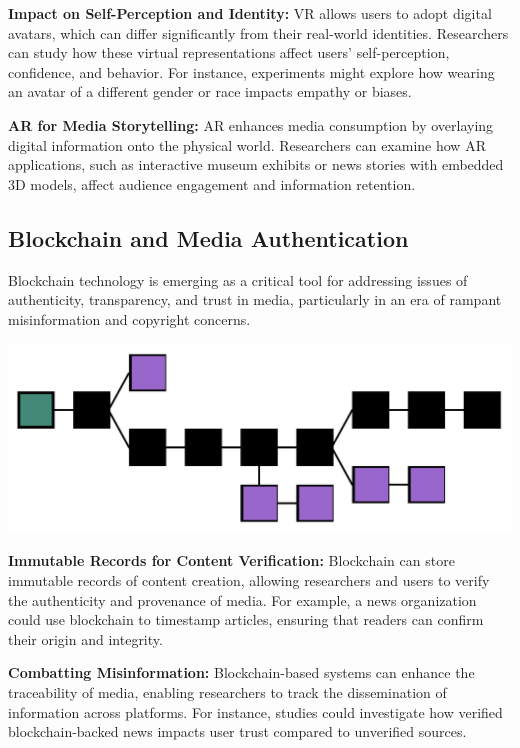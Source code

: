 \documentclass[
]{book}
\begin{document}
\textbf{Impact on Self-Perception and Identity:} VR allows users to adopt digital avatars, which can differ significantly from their real-world identities. Researchers can study how these virtual representations affect users' self-perception, confidence, and behavior. For instance, experiments might explore how wearing an avatar of a different gender or race impacts empathy or biases.

\textbf{AR for Media Storytelling:} AR enhances media consumption by overlaying digital information onto the physical world. Researchers can examine how AR applications, such as interactive museum exhibits or news stories with embedded 3D models, affect audience engagement and information retention.

\subsection{Blockchain and Media Authentication}\label{blockchain-and-media-authentication}

Blockchain technology is emerging as a critical tool for addressing issues of authenticity, transparency, and trust in media, particularly in an era of rampant misinformation and copyright concerns.

\href{https://en.wikipedia.org/wiki/Blockchain}{\includegraphics[width=1\textwidth,height=\textheight]{images/blockchain.png}}

\textbf{Immutable Records for Content Verification:} Blockchain can store immutable records of content creation, allowing researchers and users to verify the authenticity and provenance of media. For example, a news organization could use blockchain to timestamp articles, ensuring that readers can confirm their origin and integrity.

\textbf{Combatting Misinformation:} Blockchain-based systems can enhance the traceability of media, enabling researchers to track the dissemination of information across platforms. For instance, studies could investigate how verified blockchain-backed news impacts user trust compared to unverified sources.
\end{document}
